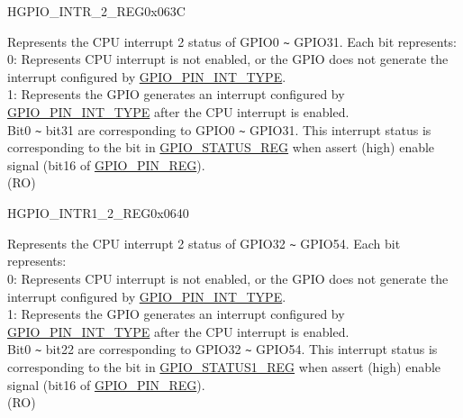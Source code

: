\begin{register}{H}{GPIO\_INTR\_2\_REG}{0x063C}\label{regdesc:GPIOINTR2REG}
%
\regnewline%
\begin{regdesc}\begin{reglist}
\label{fielddesc:GPIOINT2}\item [GPIO\_INT\_2] Represents the CPU interrupt 2 status of GPIO0 \verb+~+ GPIO31. Each bit represents:\\
0: Represents CPU interrupt is not enabled, or the GPIO does not generate the interrupt configured by \hyperref[fielddesc:GPIOPINNINTTYPE]{GPIO\_PIN\_INT\_TYPE}.\\
1: Represents the GPIO generates an interrupt configured by \hyperref[fielddesc:GPIOPINNINTTYPE]{GPIO\_PIN\_INT\_TYPE} after the CPU interrupt is enabled.\\
Bit0 \verb+~+ bit31 are corresponding to GPIO0 \verb+~+ GPIO31. This interrupt status is corresponding to the bit in \hyperref[regdesc:GPIOSTATUSREG]{GPIO\_STATUS\_REG} when assert (high) enable signal (bit16 of \hyperref[regdesc:GPIOPINNREG]{GPIO\_PIN\_REG}). \\
(RO)
\end{reglist}\end{regdesc}
\end{register}


\begin{register}{H}{GPIO\_INTR1\_2\_REG}{0x0640}\label{regdesc:GPIOINTR12REG}
%
%
\regnewline%
\begin{regdesc}\begin{reglist}
\label{fielddesc:GPIOINT12}\item [GPIO\_INT1\_2] Represents the CPU interrupt 2 status of GPIO32 \verb+~+ GPIO54. Each bit represents:\\
0: Represents CPU interrupt is not enabled, or the GPIO does not generate the interrupt configured by \hyperref[fielddesc:GPIOPINNINTTYPE]{GPIO\_PIN\_INT\_TYPE}.\\
1: Represents the GPIO generates an interrupt configured by \hyperref[fielddesc:GPIOPINNINTTYPE]{GPIO\_PIN\_INT\_TYPE} after the CPU interrupt is enabled.\\
Bit0 \verb+~+ bit22 are corresponding to GPIO32 \verb+~+ GPIO54. This interrupt status is corresponding to the bit in \hyperref[regdesc:GPIOSTATUS1REG]{GPIO\_STATUS1\_REG} when assert (high) enable signal (bit16 of \hyperref[regdesc:GPIOPINNREG]{GPIO\_PIN\_REG}). \\
(RO)
\end{reglist}\end{regdesc}
\end{register}


